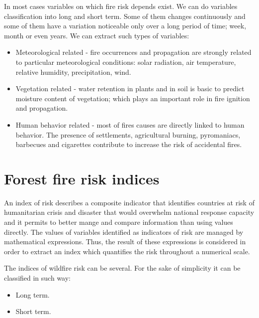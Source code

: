 {{{	In most cases variables on which fire risk depends exist. We can do variables classification into long and short term. Some of them changes continuously and some of them have a variation noticeable only over a long period of time; week, month or even years. We can extract such types of variables:
	
	\begin{itemize}
		\item Meteorological related - fire occurrences and propagation are strongly related to particular meteorological conditions: solar radiation, air temperature, relative humidity, precipitation, wind.
		\item Vegetation related - water retention in plants and in soil is basic to predict moisture content of vegetation; which plays an important role in fire ignition and propagation.
		\item Human behavior related - most of fires causes are directly linked to human behavior. The presence of settlements, agricultural burning, pyromaniacs, barbecues and cigarettes contribute to increase the risk of accidental fires.
	\end{itemize}

\section{Forest fire risk indices}
	An index of risk describes a composite indicator that identifies countries at risk of humanitarian crisis and disaster that would overwhelm national response capacity and it permits to better mange and compare information than using values directly. The values of variables identified as indicators of risk are managed by mathematical expressions. Thus, the result of these expressions is considered in order to extract an index which quantifies the risk throughout a numerical scale.
	
	The indices of wildfire risk can be several. For the sake of simplicity it can be classified in such way:
	
	\begin{itemize}
		\item Long term.
		\item Short term.
	\end{itemize}
	
}}}
